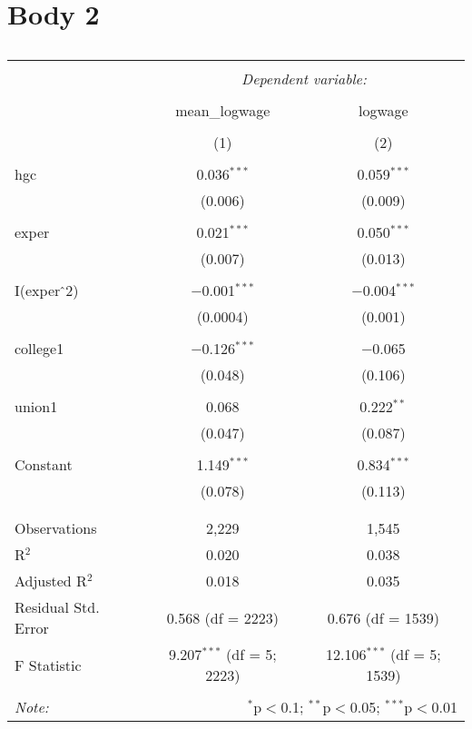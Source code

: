 \documentclass{article}
\begin{document}
\section{Body 2}
\begin{table}[!htbp] \centering 
  \caption{} 
  \label{} 
\begin{tabular}{@{\extracolsep{5pt}}lcc} 
\\[-1.8ex]\hline 
\hline \\[-1.8ex] 
 & \multicolumn{2}{c}{\textit{Dependent variable:}} \\ 
\cline{2-3} 
\\[-1.8ex] & mean\_logwage & logwage \\ 
\\[-1.8ex] & (1) & (2)\\ 
\hline \\[-1.8ex] 
 hgc & 0.036$^{***}$ & 0.059$^{***}$ \\ 
  & (0.006) & (0.009) \\ 
  & & \\ 
 exper & 0.021$^{***}$ & 0.050$^{***}$ \\ 
  & (0.007) & (0.013) \\ 
  & & \\ 
 I(exper$\hat{\mkern6mu}$2) & $-$0.001$^{***}$ & $-$0.004$^{***}$ \\ 
  & (0.0004) & (0.001) \\ 
  & & \\ 
 college1 & $-$0.126$^{***}$ & $-$0.065 \\ 
  & (0.048) & (0.106) \\ 
  & & \\ 
 union1 & 0.068 & 0.222$^{**}$ \\ 
  & (0.047) & (0.087) \\ 
  & & \\ 
 Constant & 1.149$^{***}$ & 0.834$^{***}$ \\ 
  & (0.078) & (0.113) \\ 
  & & \\ 
\hline \\[-1.8ex] 
Observations & 2,229 & 1,545 \\ 
R$^{2}$ & 0.020 & 0.038 \\ 
Adjusted R$^{2}$ & 0.018 & 0.035 \\ 
Residual Std. Error & 0.568 (df = 2223) & 0.676 (df = 1539) \\ 
F Statistic & 9.207$^{***}$ (df = 5; 2223) & 12.106$^{***}$ (df = 5; 1539) \\ 
\hline 
\hline \\[-1.8ex] 
\textit{Note:}  & \multicolumn{2}{r}{$^{*}$p$<$0.1; $^{**}$p$<$0.05; $^{***}$p$<$0.01} \\ 
\end{tabular} 
\end{table} 
\end{document}
